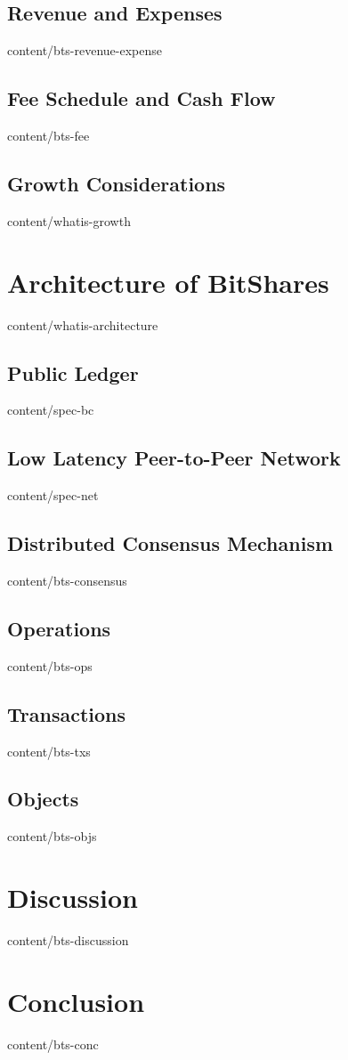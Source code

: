 \documentclass{btswhitepaper}
\begin{document}
\subsection    { Revenue and Expenses              }  { content/bts-revenue-expense }
\subsection    { Fee Schedule and Cash Flow        }  { content/bts-fee             }
\subsection    { Growth Considerations             }  { content/whatis-growth       } 

\section       { Architecture of BitShares         }  { content/whatis-architecture } 
\subsection    { Public Ledger                     }  { content/spec-bc             } 
\subsection    { Low Latency Peer-to-Peer Network  }  { content/spec-net            } 
\subsection    { Distributed Consensus Mechanism   }  { content/bts-consensus       } 
\subsection    { Operations                        }  { content/bts-ops             } 
\subsection    { Transactions                      }  { content/bts-txs             } 
\subsection    { Objects                           }  { content/bts-objs            } 

\section       { Discussion                        }  { content/bts-discussion      } 

\section       { Conclusion                        }  { content/bts-conc            } 




\end{document}
